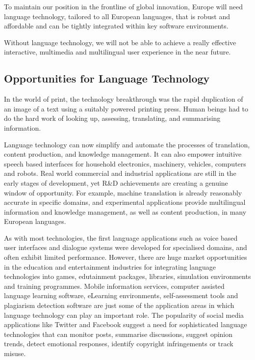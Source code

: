 \begin{multicols}{2}
To maintain our position in the frontline of global innovation, Europe will need language technology, tailored to all European languages, that is robust and affordable and can be tightly integrated within key software environments. 

Without language technology, we will not be able to achieve a really effective interactive, multimedia and multilingual user experience in the near future.

\subsection{Opportunities for Language Technology}

In the world of print, the technology breakthrough was the rapid duplication of an image of a text using a suitably powered printing press. Human beings had to do the hard work of looking up, assessing, translating, and summarising information.

Language technology can now simplify and automate the processes of translation, content production, and knowledge management. It can also empower intuitive speech based interfaces for household electronics, machinery, vehicles, computers and robots. Real world commercial and industrial applications are still in the early stages of development, yet R\&D achievements are creating a genuine window of opportunity. For example, machine translation is already reasonably accurate in specific domains, and experimental applications provide multilingual information and knowledge management, as well as content production, in many European languages. 

As with most technologies, the first language applications such as voice based user interfaces and dialogue systems were developed for specialised domains, and often exhibit limited performance. However, there are huge market opportunities in the education and entertainment industries for integrating language technologies into games, edutainment packages, libraries, simulation environments and training programmes. Mobile information services, computer assisted language learning software, eLearning environments, self-assessment tools and plagiarism detection software are just some of the application areas in which language technology can play an important role. The popularity of social media applications like Twitter and Facebook suggest a need for sophisticated language technologies that can monitor posts, summarise discussions, suggest opinion trends, detect emotional responses, identify copyright infringements or track misuse.


\end{multicols}

